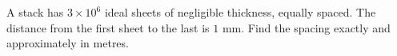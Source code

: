 A stack has $3\times10^6$ ideal sheets of negligible thickness, equally spaced. The distance from the first sheet to the last is $1$ mm. Find the spacing exactly and approximately in metres.

